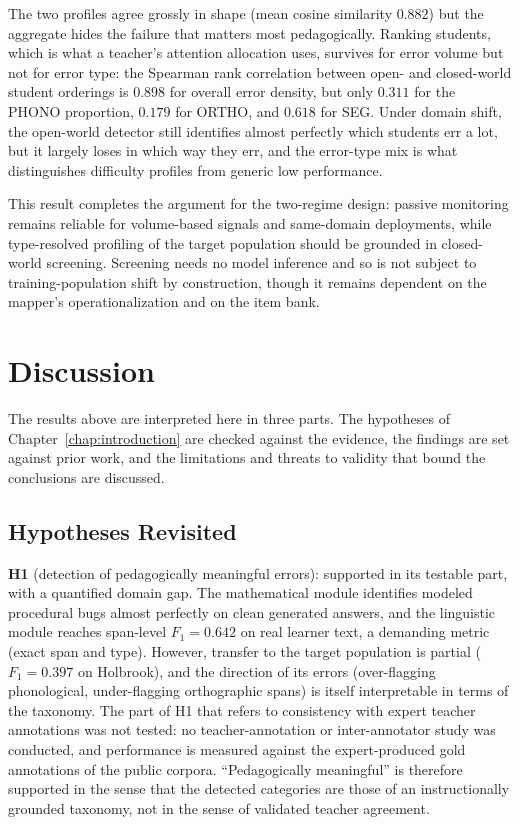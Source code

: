 The two profiles agree grossly in shape (mean cosine similarity $0.882$) but the aggregate hides the failure that matters most pedagogically. Ranking students, which is what a teacher's attention allocation uses, survives for error volume but not for error type: the Spearman rank correlation between open- and closed-world student orderings is $0.898$ for overall error density, but only $0.311$ for the PHONO proportion, $0.179$ for ORTHO, and $0.618$ for SEG. Under domain shift, the open-world detector still identifies almost perfectly which students err a lot, but it largely loses in which way they err, and the error-type mix is what distinguishes difficulty profiles from generic low performance.

This result completes the argument for the two-regime design: passive monitoring remains reliable for volume-based signals and same-domain deployments, while type-resolved profiling of the target population should be grounded in closed-world screening. Screening needs no model inference and so is not subject to training-population shift by construction, though it remains dependent on the mapper's operationalization and on the item bank.

\section{Discussion}
\label{sec:eval_discuss}

The results above are interpreted here in three parts. The hypotheses of Chapter~\ref{chap:introduction} are checked against the evidence, the findings are set against prior work, and the limitations and threats to validity that bound the conclusions are discussed.

\subsection{Hypotheses Revisited}
\label{sec:eval_discuss_hyp}

\textbf{H1} (detection of pedagogically meaningful errors): supported in its testable part, with a quantified domain gap. The mathematical module identifies modeled procedural bugs almost perfectly on clean generated answers, and the linguistic module reaches span-level $F_1 = 0.642$ on real learner text, a demanding metric (exact span and type). However, transfer to the target population is partial ($F_1 = 0.397$ on Holbrook), and the direction of its errors (over-flagging phonological, under-flagging orthographic spans) is itself interpretable in terms of the taxonomy. The part of H1 that refers to consistency with expert teacher annotations was not tested: no teacher-annotation or inter-annotator study was conducted, and performance is measured against the expert-produced gold annotations of the public corpora. ``Pedagogically meaningful'' is therefore supported in the sense that the detected categories are those of an instructionally grounded taxonomy, not in the sense of validated teacher agreement.

